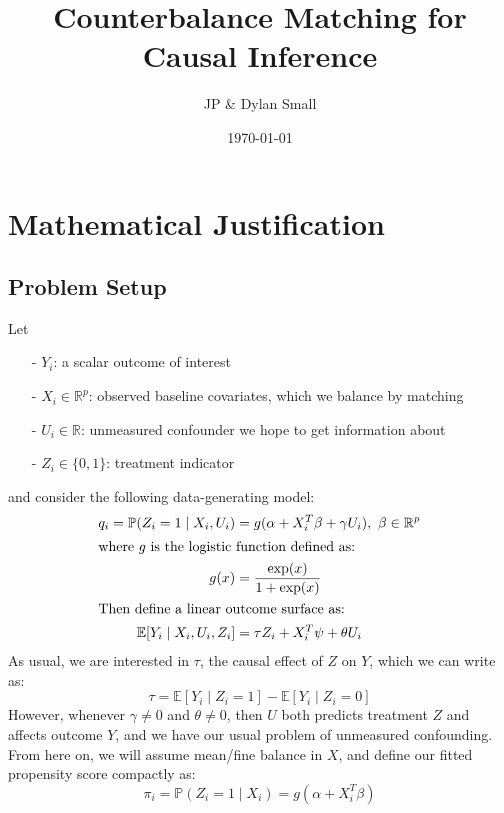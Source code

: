 \documentclass[12pt,letterpaper]{article}  %
\title{Counterbalance Matching for Causal Inference}
\author{JP \& Dylan Small}
\date{\today}
\begin{document}
\maketitle

\section*{Mathematical Justification}

\subsection*{Problem Setup}

Let
\begin{itemize}
    \item[-] $Y_i$: a scalar outcome of interest
    \item[-] $X_i \in \mathbb{R}^p$: observed baseline covariates, which we balance by matching
    \item[-] $U_i \in \mathbb{R}$: unmeasured confounder we hope to get information about
    \item[-] $Z_i \in \{0, 1\}$: treatment indicator
\end{itemize}
and consider the following data-generating model:
\begin{align*}
    q_i = \mathbb{P}(Z_i = 1 \mid X_i, U_i) &= g(\alpha + X_i^T \beta + \gamma U_i),\ \beta \in \mathbb{R}^p \\
    \intertext{where $g$ is the logistic function defined as:}
    g(x) &= \frac{\exp(x)}{1 + \exp(x)} \\
    \intertext{Then define a linear outcome surface as:}
    \mathbb{E}[Y_i \mid X_i, U_i, Z_i] &= \tau Z_i + X_i^T \psi + \theta U_i
\end{align*}
As usual, we are interested in $\tau$, the causal effect of $Z$ on $Y$, which we can write as:
\begin{equation*}
    \tau = \mathbb{E}[Y_i \mid Z_i = 1] - \mathbb{E}[Y_i \mid Z_i = 0]
\end{equation*}
However, whenever $\gamma \neq 0$ and $\theta \neq 0$, then $U$ both predicts treatment $Z$ and affects outcome $Y$, and we have our usual problem of unmeasured confounding. From here on, we will assume mean/fine balance in $X$, and define our fitted propensity score compactly as:
\begin{equation*}
    \pi_i = \mathbb{P}(Z_i = 1 \mid X_i) = g(\alpha + X_i^T \beta)
\end{equation*}
\end{document}
